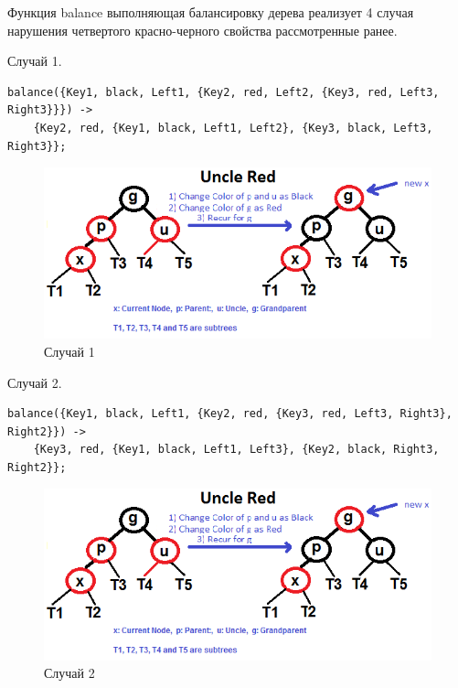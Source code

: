 			Функция balance выполняющая балансировку дерева реализует 4 случая нарушения 
			четвертого красно-черного свойства рассмотренные ранее.
			
			Случай 1.
			\begin{lstlisting}
balance({Key1, black, Left1, {Key2, red, Left2, {Key3, red, Left3, Right3}}}) ->    
	{Key2, red, {Key1, black, Left1, Left2}, {Key3, black, Left3, Right3}};		    
			\end{lstlisting}
			\begin{figure}[H]
				\centering
				\includegraphics[width=\textwidth]{img/tan-aus.png}
				\caption{Случай 1}
			\end{figure}
			
			Случай 2.
			\begin{lstlisting}
balance({Key1, black, Left1, {Key2, red, {Key3, red, Left3, Right3}, Right2}}) ->   
	{Key3, red, {Key1, black, Left1, Left3}, {Key2, black, Right3, Right2}};	    
			\end{lstlisting} 
			\begin{figure}[H]
				\centering
				\includegraphics[width=\textwidth]{img/tan-aus.png}
				\caption{Случай 2}
			\end{figure}
			
